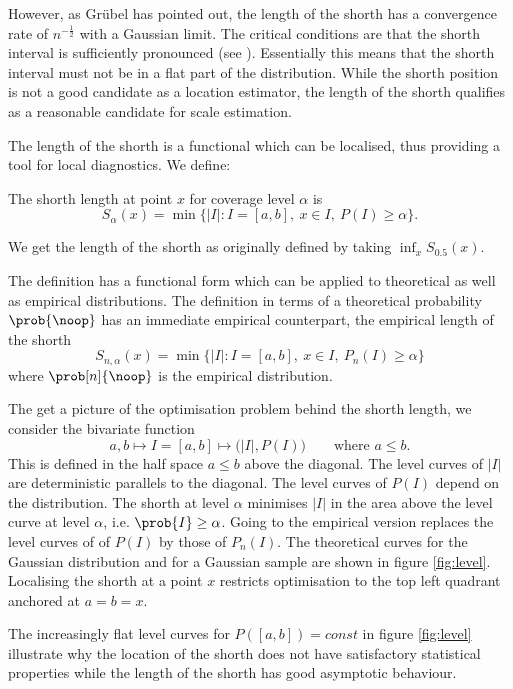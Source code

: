 \documentclass[dvips,12pt,a4paper,twoside]{amsart}
\newcommand{\gsnote}[1]{}
\newcommand{\gsnote}[1]{\marginpar{\textcolor{green}{#1}}}%
\begin{document}
However, as Gr\"ubel \cite{grbl88lshrt} has pointed out, the length of the shorth has a convergence rate of $n^{-\frac{1}{2}}$ with a Gaussian limit. The critical conditions are that the shorth interval is sufficiently pronounced (see \cite[section 3.3]{grbl88lshrt}).  Essentially this means that the shorth interval must not be in a flat part of the distribution. While the shorth position is not a good candidate as a location estimator, the length of the shorth qualifies as a reasonable candidate for scale estimation.

The length of the shorth is a functional which can be localised, thus providing a tool for local diagnostics.
We define:
\begin{dfn} The shorth length  at point $x$ for coverage level $\alpha$ is
$$
S_\alpha(x)=  \min \{|I|: I=[a,b],\  x \in I,\  P(I) \geq \alpha\}.
$$ 
\label{dfn:shrth}
\end{dfn}

We get the length of the shorth as originally defined by taking $\inf_{x}S_{0.5}(x)$.

The definition has a functional form which can be applied to theoretical as well as empirical distributions. The definition in terms of a theoretical probability $\prob{\noop}$ has an immediate empirical counterpart, the empirical length of the shorth
$$
S_{n, \alpha}(x)=  \min \{|I|: I=[a,b],\   x  \in I,\  P_n(I) \geq \alpha\}
$$ 
where  $\prob[n]{\noop}$ is the empirical distribution.

The get a picture of the optimisation problem behind the shorth length, we consider the bivariate function
$$
a,b \longmapsto I = [a,b] \longmapsto \big( \left| I \right|, P\left(I\right) \big)\qquad \text{where } a \leq b.
$$
This is defined in the half space $a \leq b$ above the diagonal. The level curves of $ \left| I \right|$ are deterministic parallels to the diagonal. The level curves of $P(I)$ depend on the distribution. The shorth at level $\alpha$ minimises $\left| I \right|$ in the area above the level curve at level 
$\alpha$, i.e. $\prob{I} \geq \alpha$. Going to the empirical version replaces the level curves of of $P(I)$ by those of  $P_n(I)$. 
The theoretical curves for the Gaussian distribution and for a  Gaussian sample are shown in figure \ref{fig:level}.
 Localising the shorth at a point $x$ restricts optimisation to the top left quadrant anchored at $a=b=x$.
 
\gsnote{paragraph added}The increasingly flat level curves for $P([a,b]) = const$  in figure \ref{fig:level} illustrate why the location of the shorth does not have satisfactory statistical properties while the length of the shorth has good asymptotic behaviour.
\end{document}
